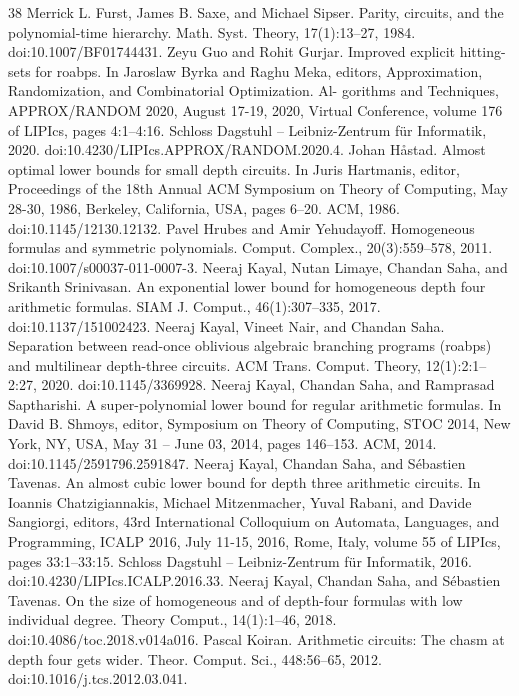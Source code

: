 \begin{thebibliography}{38}
 Merrick L. Furst, James B. Saxe, and Michael Sipser. Parity, circuits, and the polynomial-time hierarchy. Math. Syst. Theory, 17(1):13–27, 1984. doi:10.1007/BF01744431.
 Zeyu Guo and Rohit Gurjar. Improved explicit hitting-sets for roabps. In Jaroslaw Byrka and Raghu Meka, editors, Approximation, Randomization, and Combinatorial Optimization. Al- gorithms and Techniques, APPROX/RANDOM 2020, August 17-19, 2020, Virtual Conference, volume 176 of LIPIcs, pages 4:1–4:16. Schloss Dagstuhl – Leibniz-Zentrum für Informatik, 2020. doi:10.4230/LIPIcs.APPROX/RANDOM.2020.4.
 Johan Håstad. Almost optimal lower bounds for small depth circuits. In Juris Hartmanis, editor, Proceedings of the 18th Annual ACM Symposium on Theory of Computing, May 28-30, 1986, Berkeley, California, USA, pages 6–20. ACM, 1986. doi:10.1145/12130.12132.
 Pavel Hrubes and Amir Yehudayoff. Homogeneous formulas and symmetric polynomials. Comput. Complex., 20(3):559–578, 2011. doi:10.1007/s00037-011-0007-3.
 Neeraj Kayal, Nutan Limaye, Chandan Saha, and Srikanth Srinivasan. An exponential lower bound for homogeneous depth four arithmetic formulas. SIAM J. Comput., 46(1):307–335, 2017. doi:10.1137/151002423.
 Neeraj Kayal, Vineet Nair, and Chandan Saha. Separation between read-once oblivious algebraic branching programs (roabps) and multilinear depth-three circuits. ACM Trans. Comput. Theory, 12(1):2:1–2:27, 2020. doi:10.1145/3369928.
 Neeraj Kayal, Chandan Saha, and Ramprasad Saptharishi. A super-polynomial lower bound for regular arithmetic formulas. In David B. Shmoys, editor, Symposium on Theory of Computing, STOC 2014, New York, NY, USA, May 31 – June 03, 2014, pages 146–153. ACM, 2014. doi:10.1145/2591796.2591847.
 Neeraj Kayal, Chandan Saha, and Sébastien Tavenas. An almost cubic lower bound for depth three arithmetic circuits. In Ioannis Chatzigiannakis, Michael Mitzenmacher, Yuval Rabani, and Davide Sangiorgi, editors, 43rd International Colloquium on Automata, Languages, and Programming, ICALP 2016, July 11-15, 2016, Rome, Italy, volume 55 of LIPIcs, pages 33:1–33:15. Schloss Dagstuhl – Leibniz-Zentrum für Informatik, 2016. doi:10.4230/LIPIcs.ICALP.2016.33.
 Neeraj Kayal, Chandan Saha, and Sébastien Tavenas. On the size of homogeneous and of depth-four formulas with low individual degree. Theory Comput., 14(1):1–46, 2018. doi:10.4086/toc.2018.v014a016.
 Pascal Koiran. Arithmetic circuits: The chasm at depth four gets wider. Theor. Comput. Sci., 448:56–65, 2012. doi:10.1016/j.tcs.2012.03.041.

\end{thebibliography}
